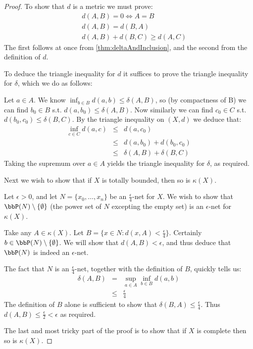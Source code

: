 \documentclass[a4paper,11pt]{article}
\begin{document}
\begin{proof}
To show that $d$ is a metric we must prove:
\begin{eqnarray*}
&&d(A,B)=0 \iff A=B \\
&&d(A,B)=d(B,A) \\
&&d(A,B)+d(B,C)\geq d(A,C)
\end{eqnarray*}
%
The first follows at once from \ref{thm:deltaAndInclusion}, and the second from
the definition of $d$.

To deduce the triangle inequality for $d$ it suffices to prove the triangle
inequality for $\delta$, which we do as follows:

Let $a\in A$.  We know $\inf_{b\in B}d(a,b)\leq\delta(A,B)$, so (by compactness
of B) we can find $b_0\in B$ s.t.
$d(a,b_0)\leq\delta(A,B)$.  Now similarly we can
find $c_0\in C$ s.t. $d(b_0,c_0)\leq\delta(B,C)$.
By the triangle inequality on
$(X,d)$ we deduce that:
%
\begin{eqnarray*}
\inf_{c\in C}d(a,c)&\leq&d(a,c_0) \\
  &\leq& d(a,b_0)+d(b_0,c_0) \\
  &\leq& \delta(A,B)+\delta(B,C)
\end{eqnarray*}
%
Taking the supremum over $a\in A$ yields the triangle inequality for $\delta$,
as required.

Next we wish to show that if $X$ is totally bounded, then so is $\kappa(X)$.

Let $\epsilon>0$, and let $N=\{x_0,\ldots,x_n\}$ be an $\frac{\epsilon}{4}$-net
for $X$.  We wish to show that
$\bbP(N)\setminus\{\emptyset\}$ (the power set of $N$
excepting the empty set) is an
$\epsilon$-net for $\kappa(X)$.

Take any $A\in\kappa(X)$.  Let $B=\{x\in N:d(x,A)<\frac{\epsilon}{4}\}$.
Certainly $b\in\bbP(N)\setminus\{\emptyset\}$.  We
will show that $d(A,B)<\epsilon$, and thus deduce that $\bbP(N)$ is indeed an
$\epsilon$-net.

The fact that $N$ is an $\frac{\epsilon}{4}$-net, together with the definition
of $B$, quickly tells us:
%
\begin{eqnarray*}
\delta(A,B)
  &=& \sup_{a\in A}\inf_{b\in B}d(a,b) \\
  &\leq& \frac{\epsilon}{4}
\end{eqnarray*}
%
The definition of $B$ alone is sufficient to show that
$\delta(B,A)\leq\frac{\epsilon}{4}$.  Thus
$d(A,B)\leq\frac{\epsilon}{2}<\epsilon$ as required.

The last and most tricky part of the proof is to show that if $X$ is complete
then so is $\kappa(X)$.


\end{proof}
\end{document}
